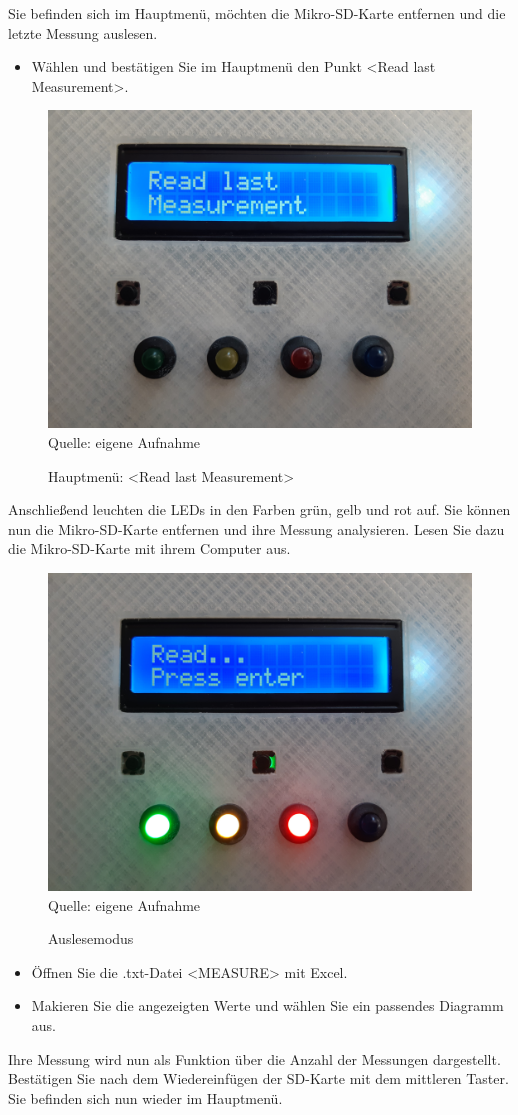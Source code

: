 \label{Auswertung}

Sie befinden sich im Hauptmenü, möchten die Mikro-SD-Karte entfernen und die letzte Messung auslesen.
\begin{itemize}
	\item Wählen und bestätigen Sie im Hauptmenü den Punkt <Read last Measurement>. 
\end{itemize}

\begin{figure}[!hbt]
	\centering
	\includegraphics[width=0.4\linewidth]{Images/ReadLastMeasurement}
	\footnotesize \\Quelle: eigene Aufnahme
	\caption{Hauptmenü: <Read last Measurement>}
	\label{fig:Readlast}
\end{figure}

Anschließend leuchten die \ac{LED}s in den Farben grün, gelb und rot auf. Sie können nun die Mikro-SD-Karte entfernen und ihre Messung analysieren. Lesen Sie dazu die Mikro-SD-Karte mit ihrem Computer aus.

\begin{figure}[!hbt]
	\centering
	\includegraphics[width=0.4\linewidth]{Images/Read}
	\footnotesize \\Quelle: eigene Aufnahme
	\caption{Auslesemodus}
	\label{fig:Read}
\end{figure}
 
\begin{itemize}
	\item Öffnen Sie die .txt-Datei <MEASURE> mit Excel.
	\item Makieren Sie die angezeigten Werte und wählen Sie ein passendes Diagramm aus.
\end{itemize}
Ihre Messung wird nun als Funktion über die Anzahl der Messungen dargestellt. Bestätigen Sie nach dem Wiedereinfügen der SD-Karte mit dem mittleren Taster. Sie befinden sich nun wieder im Hauptmenü.
